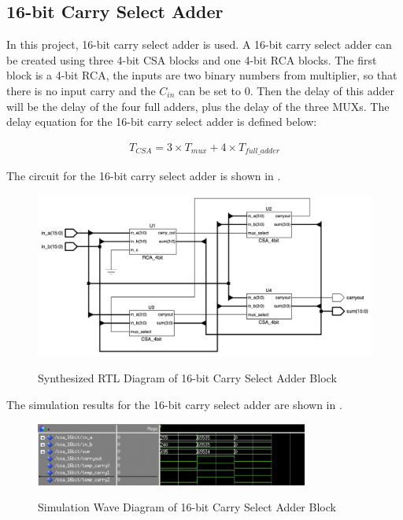 \newpage

\subsection{16-bit Carry Select Adder}

In this project, 16-bit carry select adder is used.
A 16-bit carry select adder can be created using three 4-bit CSA blocks and one 4-bit RCA blocks.
The first block is a 4-bit RCA, the inputs are two binary numbers from multiplier, so that there is no input carry and the \(C_{in}\) can be set to 0.
Then the delay of this adder will be the delay of the four full adders, plus the delay of the three MUXs.
The delay equation for the 16-bit carry select adder is defined below:

\begin{equation}
	\begin{array}{c}
		T_{CSA} = 3 \times T_{mux} + 4 \times T_{full\_adder}
	\end{array}
	\label{exp:csa_16b_delay_exp}
\end{equation}

\noindent The circuit for the 16-bit carry select adder is shown in .

\begin{figure}[!htp]
	\centering
	\caption{Synthesized RTL Diagram of 16-bit Carry Select Adder Block}
	\includegraphics[width=\textwidth]{../img/csa_16_rtl.png}
	\label{fig:csa_16_rtl}
\end{figure}

\noindent The simulation results for the 16-bit carry select adder are shown in .

\begin{figure}[!htp]
	\centering
	\caption{Simulation Wave Diagram of 16-bit Carry Select Adder Block}
	\includegraphics[width=0.8\textwidth]{../img/csa_16_sim.png}
	\label{fig:csa_16_sim}
\end{figure}

